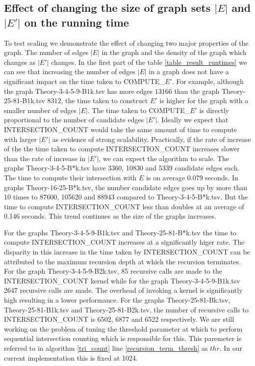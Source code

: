 \documentclass[conference]{IEEEtran}
\begin{document}
\subsection{Effect of changing the size of graph sets $|E|$ and $|E'|$ on the running time}
To test scaling we demonstrate the effect of changing two major properties of the graph. The number of edges $|E|$ in the graph and the density of the graph which changes as $|E'|$ changes. In the first part of the table \ref{table_result_runtimes} we can see that increasing the number of edges $|E|$ in a graph does not have a significant impact on the time taken to COMPUTE\_$E'$. For example, although the graph Theory-3-4-5-9-B1k.tsv has more edges $13166$ than the graph Theory-25-81-B1k.tsv $8312$, the time taken to construct $E'$ is higher for the graph with a smaller number of edges $|E|$. The time taken to COMPUTE\_$E'$ is directly proportional to the number of candidate edges $|E'|$. Ideally we expect that INTERSECTION\_COUNT would take the same amount of time to compute with larger $|E'|$ as evidence of strong scalability. Practically, if the rate of increase of the the time taken to compute INTERSECTION\_COUNT increases slower than the rate of increase in $|E'|$, we can expect the algorithm to scale. The graphs Theory-3-4-5-B*k.tsv have 3360, 10830 and 5339 candidate edges each. The time to compute their intersection with $E$ is on average 0.079 seconds. In graphs Theory-16-25-B*k.tsv, the number candidate edges goes up by more than 10 times to 87600, 105620 and 88943 compared to Theory-3-4-5-B*k.tsv. But the time to compute INTERSECTION\_COUNT less than doubles at an average of 0.146 seconds. This trend continues as the size of the graphs increases. 

For the graphs Theory-3-4-5-9-B1k.tsv and Theory-25-81-B*k.tsv the time to compute INTERSECTION\_COUNT increases at a significantly higer rate. The disparity in this increase in the time taken by INTERSECTION\_COUNT can be attributed to the maximum recursion depth at which the recursion terminates. For the graph Theory-3-4-5-9-B2k.tsv, 85 recursive calls are made to the INTERSECTION\_COUNT kernel while for the graph Theory-3-4-5-9-B1k.tsv 2647 recursive calls are made. The overhead of invoking a kernel is significantly high resulting in a lower performance. For the graphs Theory-25-81-Bk.tsv, Theory-25-81-B1k.tsv and Theory-25-81-B2k.tsv, the number of recursive calls to INTERSECTION\_COUNT is 6502, 6877 and 6522 respectively. We are still working on the problem of tuning the threshold parameter at which to perform sequential intersection counting which is responsible for this. This paremeter is referred to in algorithm \ref{tri_count} line \ref{recursion_term_thresh} as $thr$. In our current implementation this is fixed at 1024.
\end{document}
